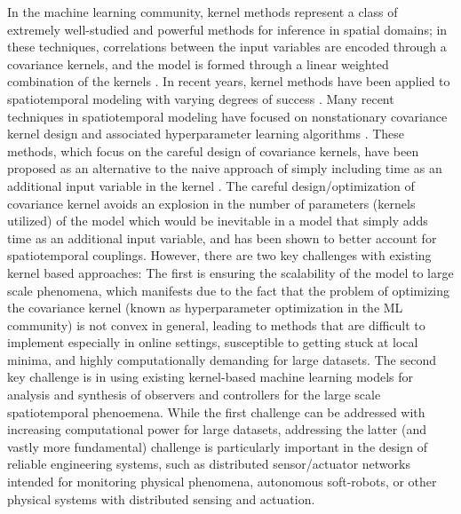 
In the machine learning community, kernel methods represent a class of extremely well-studied and powerful methods for inference in spatial domains; in these techniques, correlations between the input variables are encoded through a covariance kernels, and the model is formed through a linear weighted combination of the kernels \cite{RasmussenWilliams2005,schoelkopf01kernelbased,scholkopf2002learning}. In recent years, kernel methods have been applied to spatiotemporal modeling with varying degrees of success \cite{cressie2011statistics,RasmussenWilliams2005}. Many recent techniques in spatiotemporal modeling have focused on nonstationary covariance kernel design and associated hyperparameter learning algorithms \cite{garg2012AAAI,ma2003nonstationary,plagemann2008nonstationary}. These methods, which focus on the careful design of covariance kernels,  have been proposed as an alternative to the naive approach of  simply including time as an additional input variable in the kernel \cite{Chowdhary13_CDC1}. The careful design/optimization of covariance kernel avoids an explosion in the number of parameters (kernels utilized) of the model which would be inevitable in a model that simply adds time as an additional input variable, and has been shown to better account for spatiotemporal couplings. However, there are two key challenges with existing kernel based approaches: The first is ensuring the scalability of the model to large scale phenomena, which manifests due to the fact that the problem of optimizing the covariance kernel (known as hyperparameter optimization in the ML community) is not convex in general, leading to methods that are difficult to implement especially in online settings, susceptible to getting stuck at local minima, and highly computationally demanding for large datasets. %
The second key challenge is in using existing kernel-based machine learning models for analysis and synthesis of observers and controllers for the large scale spatiotemporal phenoemena. While the first challenge can be addressed with increasing computational power for large datasets, addressing the latter (and vastly more fundamental) challenge is particularly important in the design of reliable engineering systems, such as distributed sensor/actuator networks intended for monitoring physical phenomena, autonomous soft-robots, or other physical systems with distributed sensing and actuation.  %
% 
   
